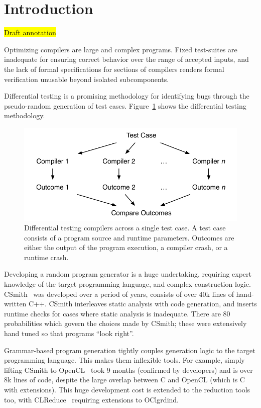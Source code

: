 \section{Introduction}\label{sec:intro}

\hl{Draft annotation}

\noindent
Optimizing compilers are large and complex programs. Fixed test-suites are inadequate for ensuring correct behavior over the range of accepted inputs, and the lack of formal specifications for sections of compilers renders formal verification unusable beyond isolated subcomponents.

Differential testing is a promising methodology for identifying bugs through the pseudo-random generation of test cases. Figure~\ref{fig:difftest} shows the differential testing methodology.

\begin{figure}
	\centering
	\includegraphics[width=.9\columnwidth]{img/difftest} %
	\caption{%
		Differential testing compilers across a single test case. A test case consists of a program source and runtime parameters. Outcomes are either the output of the program execution, a compiler crash, or a runtime crash.%
	}%
	\label{fig:difftest}
\end{figure}

Developing a random program generator is a huge undertaking, requiring expert knowledge of the target programming language, and complex construction logic. CSmith~\cite{Yang2011} was developed over a period of years, consists of over 40k lines of hand-written C++. CSmith interleaves static analysis with code generation, and inserts runtime checks for cases where static analysis is inadequate. There are 80 probabilities which govern the choices made by CSmith; these were extensively hand tuned so that programs ``look right''.

Grammar-based program generation tightly couples generation logic to the target programming language. This makes them inflexible tools. For example, simply lifting CSmith to OpenCL~\cite{Lidbury2015a} took 9 months (confirmed by developers) and is over 8k lines of code, despite the large overlap between C and OpenCL (which is C with extensions). This huge development cost is extended to the reduction tools too, with CLReduce~\cite{Pflanzer2016} requiring extensions to OClgrdind.

